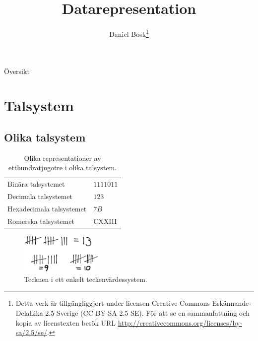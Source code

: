 \documentclass{beamer}
\title{%
  Datarepresentation
}
\author{Daniel Bosk\footnote{%
  \tiny
  Detta verk är tillgängliggjort under licensen Creative Commons 
  Erkännande-DelaLika 2.5 Sverige (CC BY-SA 2.5 SE).
  För att se en sammanfattning och kopia av licenstexten besök URL 
  \url{http://creativecommons.org/licenses/by-sa/2.5/se/}.
}}
\institute[MIUN IKS]{%
  Avdelningen för informations- och kommunikationssytem (IKS),\\
  Mittuniversitetet, Sundsvall.
}
\date{\svnId}
\theoremstyle{definition}
\theoremstyle{remark}
\begin{document}
\begin{frame}
  \titlepage
\end{frame}

\begin{frame}{Översikt}
  \tableofcontents
\end{frame}

\begin{frame}
  
\end{frame}





\section{Talsystem}

\subsection{Olika talsystem}

\begin{frame}{\insertsubsectionhead}
  \begin{table}
    \caption{Olika representationer av etthundratjugotre i olika talsystem.}
    \begin{tabular}{ll}
      \toprule
      Binära talsystemet & \(1111011\) \\
      Decimala talsystemet & \(123\) \\
      Hexadecimala talsystemet & \(7B\) \\
      Romerska talsystemet & CXXIII \\
      \bottomrule
    \end{tabular}
    \label{tbl:OlikaEtthundratjugotre}
  \end{table}
\end{frame}

\begin{frame}{\insertsubsectionhead}
  \begin{figure}
    \includegraphics[width=4cm]{strecktal.eps}
    \caption{Tecknen i ett enkelt teckenvärdessystem.}
    \label{fig:Strecktal}
  \end{figure}
\end{frame}
\end{document}
